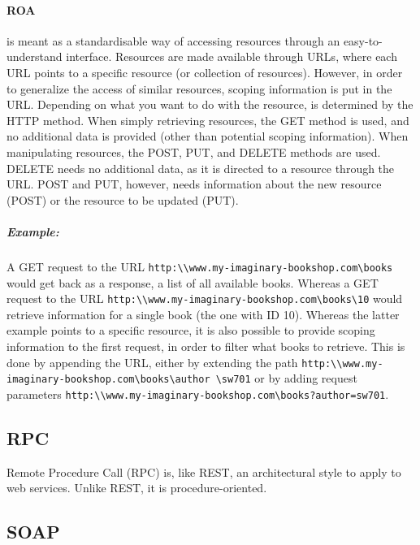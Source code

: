 \paragraph{ROA} is meant as a standardisable way of accessing resources through an easy-to-understand interface.
Resources are made available through URLs, where each URL points to a specific resource (or collection of resources).
However, in order to generalize the access of similar resources, scoping information is put in the URL.
Depending on what you want to do with the resource, is determined by the HTTP method.
When simply retrieving resources, the GET method is used, and no additional data is provided (other than potential scoping information).
When manipulating resources, the POST, PUT, and DELETE methods are used.
DELETE needs no additional data, as it is directed to a resource through the URL.
POST and PUT, however, needs information about the new resource (POST) or the resource to be updated (PUT).
\subparagraph{Example:} A GET request to the URL \texttt{http:\textbackslash\textbackslash www.my-imaginary-bookshop.com\textbackslash books} would get back as a response, a list of all available books.
Whereas a GET request to the URL \texttt{http:\textbackslash\textbackslash www.my-imaginary-bookshop.com\textbackslash books\textbackslash 10} would retrieve information for a single book (the one with ID  10).
Whereas the latter example points to a specific resource, it is also possible to provide scoping information to the first request, in order to filter what books to retrieve.
This is done by appending the URL, either by extending the path \texttt{http:\textbackslash\textbackslash www.my-imaginary-bookshop.com\textbackslash books\textbackslash author \textbackslash sw701} or by adding request parameters \texttt{http:\textbackslash\textbackslash www.my-imaginary-bookshop.com\textbackslash books?author=sw701}.

\subsection{RPC}
Remote Procedure Call (RPC) is, like REST, an architectural style to apply to web services.
Unlike REST, it is procedure-oriented.

\subsection{SOAP}

